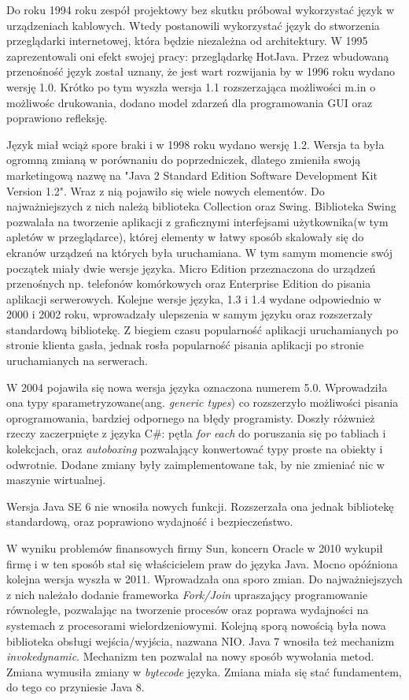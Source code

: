 Do roku 1994 roku zespół projektowy bez skutku próbował wykorzystać język w urządzeniach kablowych. Wtedy postanowili wykorzystać język do stworzenia przeglądarki internetowej, która będzie niezależna od architektury. W 1995 zaprezentowali oni efekt swojej pracy: przeglądarkę HotJava. Przez wbudowaną przenośność język został uznany, że jest wart rozwijania by w 1996 roku wydano wersję 1.0. Krótko po tym wyszła wersja 1.1 rozszerzająca możliwości m.in o możliwośc drukowania, dodano model zdarzeń dla programowania GUI oraz poprawiono refleksję.

Język miał wciąż spore braki i w 1998 roku wydano wersję 1.2. Wersja ta była ogromną zmianą w porównaniu do poprzedniczek, dlatego zmieniła swoją marketingową nazwę na "Java 2 Standard Edition Software Development Kit Version 1.2". Wraz z nią pojawiło się wiele nowych elementów. Do najważniejszych z nich należą biblioteka Collection oraz Swing. Biblioteka Swing pozwalała na tworzenie aplikacji z graficznymi interfejsami użytkownika(w tym apletów w przeglądarce), której elementy w łatwy sposób skalowały się do ekranów urządzeń na których była uruchamiana. W tym samym momencie swój początek miały dwie wersje języka. Micro Edition przeznaczona do urządzeń przenośnych np. telefonów komórkowych oraz Enterprise Edition do pisania aplikacji serwerowych. Kolejne wersje języka, 1.3 i 1.4 wydane odpowiednio w 2000 i 2002 roku, wprowadzały ulepszenia w samym języku oraz rozszerzały standardową bibliotekę. Z biegiem czasu popularność aplikacji uruchamianych po stronie klienta gasła, jednak rosła popularność pisania aplikacji po stronie uruchamianych na serwerach.

W 2004 pojawiła się nowa wersja języka oznaczona numerem 5.0. Wprowadziła ona typy sparametryzowane(ang. \textsl{generic types}) co rozszerzyło możliwości pisania oprogramowania, bardziej odpornego na błędy programisty. Doszły różwnież rzeczy zaczerpnięte z języka C\#: pętla \textsl{for each} do poruszania się po tabliach i kolekcjach, oraz \textsl{autoboxing} pozwalający konwertować typy proste na obiekty i odwrotnie. Dodane zmiany były zaimplementowane tak, by nie zmieniać nic w maszynie wirtualnej.

Wersja Java SE 6 nie wnosiła nowych funkcji. Rozszerzała ona jednak bibliotekę standardową, oraz poprawiono wydajność i bezpieczeństwo.

W wyniku problemów finansowych firmy Sun, koncern Oracle w 2010 wykupił firmę i w ten sposób stał się właścicielem praw do języka Java. Mocno opóźniona kolejna wersja wyszła w 2011. Wprowadzała ona sporo zmian. Do najważniejszych z nich należało dodanie frameworka \textsl{Fork/Join} upraszający programowanie równoległe, pozwalając na tworzenie procesów oraz poprawa wydajności na systemach z procesorami wielordzeniowymi. Kolejną sporą nowością była nowa biblioteka obsługi wejścia/wyjścia, nazwana NIO. Java 7 wnosiła też mechanizm \textsl{invokedynamic}. Mechanizm ten pozwalał na nowy sposób wywołania metod. Zmiana wymusiła zmiany w \textsl{bytecode} języka. Zmiana miała się stać fundamentem, do tego co przyniesie Java 8.

